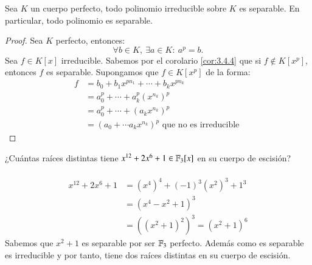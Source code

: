 \begin{thm}\label{thm:3.4.5}
    Sea $K$ un cuerpo perfecto, todo polinomio irreducible sobre $K$ es separable. En particular, todo polinomio es separable.
\end{thm}
\begin{proof}
    Sea $K$ perfecto, entonces:
    $$
        \forall b \in K,\ \exists a \in K:\ a^p = b.
    $$
    Sea $f\in K[x]$ irreducible. Sabemos por el corolario \ref{cor:3.4.4} que si $f \notin K[x^p]$, entonces $f$ es separable. Supongamos que $f \in K[x^p]$ de la forma:
    \begin{align*}
        f &= b_0 + b_1 x^{pn_1} + \cdots + b_k x^{pn_k}\\
          &= a_0^p + \cdots + a_k^p (x^{n_k})^p\\
          &= a_0^p + \cdots + (a_k x^{n_k})^p\\
          &= (a_0 + \cdots a_k x^{n_k})^p \text{ que no es irreducible }
    \end{align*}
\end{proof}

\begin{ex}[H3.16]
    ¿Cuántas raíces distintas tiene $x^{12} + 2x^6 + 1 \in \mathbb{F}_3[x]$ en su cuerpo de escisión?\\\\

    \begin{align*}
        x^{12} + 2x^6 + 1 &= (x^4)^4 + (-1)^3 (x^2)^3 + 1^3\\
                          &= (x^4 -x^2 +1) ^3\\
                          &= ((x^2 + 1)^2)^3 = (x^2 + 1)^6
    \end{align*}
    Sabemos que $x^2 + 1$ es separable por ser $\mathbb{F}_3$ perfecto. Además como es separable es irreducible y por tanto, tiene dos raíces distintas en su cuerpo de escisión.
\end{ex}

